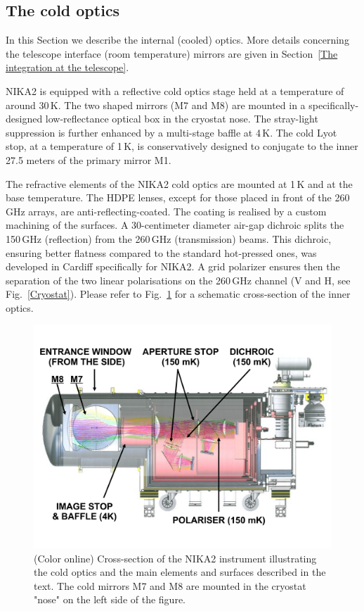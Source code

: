\documentclass[]{aa} %
\begin{document}
 \subsection{The cold optics}

In this Section we describe the internal (cooled) optics. More details concerning the telescope interface (room temperature) mirrors are given in Section~\ref{The integration at the telescope}.

NIKA2 is equipped with a reflective cold optics stage held at a temperature of around 30\,K. The two shaped mirrors (M7 and M8) are mounted in a specifically-designed low-reflectance optical box in the cryostat nose. The stray-light suppression is further enhanced by a multi-stage baffle at 4\,K. The cold Lyot stop, at a temperature of 1\,K, is conservatively designed to conjugate to the inner 27.5 meters of the primary mirror M1.

The refractive elements of the NIKA2 cold optics are mounted at 1\,K and at the base temperature. The HDPE lenses, except for those placed in front of the 260\,GHz arrays, are anti-reflecting-coated. The coating is realised by a custom machining of the surfaces. A 30-centimeter diameter air-gap dichroic splits the 150\,GHz (reflection) from the 260\,GHz (transmission) beams. This dichroic, ensuring better flatness compared to the standard hot-pressed ones, was developed in Cardiff specifically for NIKA2. A grid polarizer ensures then the separation of the two linear polarisations on the 260\,GHz channel (V and H, see Fig.~\ref{Cryostat}). Please refer to Fig.~\ref{Cryostat_optics} for a schematic cross-section of the inner optics.

\begin{figure}[h]
   \centering
   \includegraphics[width=.95\linewidth]{NIKA2_optics.pdf}
      \caption{(Color online) Cross-section of the NIKA2 instrument illustrating the cold optics and the main elements and surfaces described in the text. The cold mirrors M7 and M8 are mounted in the cryostat "nose" on the left side of the figure.}
         \label{Cryostat_optics}
\end{figure}
\end{document}
